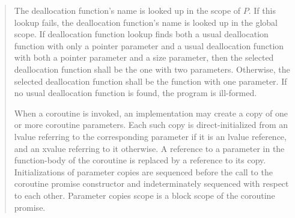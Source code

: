 \begin{quote}
\pnum
The deallocation function's name is looked up in the scope of $P$. If this lookup fails, the deallocation function's name is looked up in the global scope. If deallocation function lookup finds both a usual deallocation function with only a pointer parameter and a usual deallocation function with both a pointer parameter and a size parameter, then the selected deallocation function shall be the one with two parameters. Otherwise, the selected deallocation function shall be the function with one parameter. If no usual deallocation function is found, the program is ill-formed.


\pnum
When a coroutine is invoked, an implementation may create a copy of one or more coroutine parameters. Each such copy is direct-initialized from an lvalue referring to the corresponding parameter if it is an lvalue reference, and an xvalue referring to it otherwise. A reference to a parameter in the function-body of the coroutine is replaced by a reference to its copy.
Initializations of parameter copies are sequenced before the call to the coroutine promise constructor and indeterminately sequenced with respect to each other.
Parameter copies scope is a block scope of the coroutine promise.
%
%




\end{quote}

